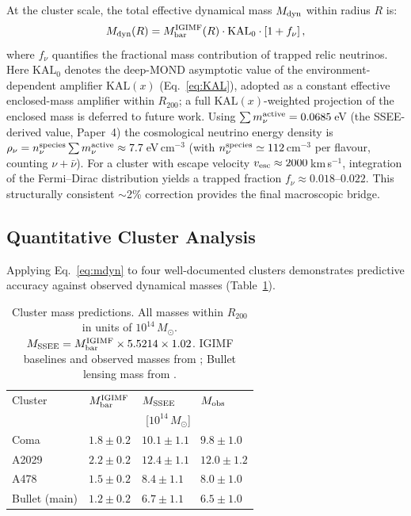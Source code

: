 \documentclass[12pt,a4paper]{article}
\newcommand{\SSEE}{\ifmmode\mathrm{SSEE}\else\textsc{ssee}\fi}
\newcommand{\KALz}{\mathrm{KAL}_0}
\newcommand{\Migimf}{M^{\mathrm{IGIMF}}_{\mathrm{bar}}}
\begin{document}
At the cluster scale, the total effective dynamical mass $M_{\rm dyn}$ within radius $R$ is:
\begin{equation}
  M_{\rm dyn}(R) = \Migimf(R)\cdot\KALz\cdot\left[1+f_\nu\right],
  \label{eq:mdyn}
\end{equation}
where $f_\nu$ quantifies the fractional mass contribution of trapped relic
neutrinos. Here $\KALz$ denotes the deep-MOND asymptotic value of the
environment-dependent amplifier $\mathrm{KAL}(x)$ (Eq.~\ref{eq:KAL}), adopted as
a constant effective enclosed-mass amplifier within $R_{200}$; a full
$\mathrm{KAL}(x)$-weighted projection of the enclosed mass is deferred to future work.
Using $\sum m_\nu^{\rm active}=0.0685$\,eV (the SSEE-derived value, Paper~4) the
cosmological neutrino energy density is
$\rho_\nu = n_\nu^{\rm species}\sum m_\nu^{\rm active}\approx 7.7$\,eV\,cm$^{-3}$
(with $n_\nu^{\rm species}\simeq112$\,cm$^{-3}$ per flavour, counting
$\nu+\bar\nu$).
For a cluster with escape velocity $v_{\rm esc}\approx2000$\,km\,s$^{-1}$, integration
of the Fermi–Dirac distribution \citep{Tremaine1979} yields a trapped fraction
$f_\nu\approx0.018$--$0.022$. This structurally consistent $\sim$2\% correction provides
the final macroscopic bridge.

\subsection{Quantitative Cluster Analysis}

Applying Eq.~\eqref{eq:mdyn} to four well-documented clusters demonstrates predictive
accuracy against observed dynamical masses (Table~\ref{tab:clusters}).

\begin{table}[H]
\centering
\caption{Cluster mass predictions. All masses within $R_{200}$ in units of
  $10^{14}\,M_\odot$. $M_{\SSEE} = \Migimf \times 5.5214 \times 1.02$.
  IGIMF baselines and observed masses from \citet{Zhang2026}; Bullet lensing
  mass from \citealt{Clowe2006}.}
\label{tab:clusters}
\footnotesize
\begin{tabularx}{\textwidth}{lXXX}
\toprule
Cluster & $M_{\rm bar}^{\rm IGIMF}$ & $M_{\rm SSEE}$ & $M_{\rm obs}$ \\
 & \multicolumn{3}{c}{[$10^{14}\,M_\odot$]} \\
\midrule
Coma          & $1.8\pm0.2$ & $10.1\pm1.1$ & $9.8\pm1.0$  \\
A2029         & $2.2\pm0.2$ & $12.4\pm1.1$ & $12.0\pm1.2$ \\
A478          & $1.5\pm0.2$ & $8.4\pm1.1$  & $8.0\pm1.0$  \\
Bullet (main) & $1.2\pm0.2$ & $6.7\pm1.1$  & $6.5\pm1.0$  \\
\bottomrule
\end{tabularx}
\end{table}
\end{document}

